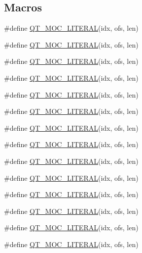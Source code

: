\subsection*{Macros}
\begin{DoxyCompactItemize}
\item 
\#define \hyperlink{a00067_a75bb9482d242cde0a06c9dbdc6b83abe}{Q\+T\+\_\+\+M\+O\+C\+\_\+\+L\+I\+T\+E\+R\+A\+L}(idx, ofs, len)
\item 
\#define \hyperlink{a00067_a75bb9482d242cde0a06c9dbdc6b83abe}{Q\+T\+\_\+\+M\+O\+C\+\_\+\+L\+I\+T\+E\+R\+A\+L}(idx, ofs, len)
\item 
\#define \hyperlink{a00067_a75bb9482d242cde0a06c9dbdc6b83abe}{Q\+T\+\_\+\+M\+O\+C\+\_\+\+L\+I\+T\+E\+R\+A\+L}(idx, ofs, len)
\item 
\#define \hyperlink{a00067_a75bb9482d242cde0a06c9dbdc6b83abe}{Q\+T\+\_\+\+M\+O\+C\+\_\+\+L\+I\+T\+E\+R\+A\+L}(idx, ofs, len)
\item 
\#define \hyperlink{a00067_a75bb9482d242cde0a06c9dbdc6b83abe}{Q\+T\+\_\+\+M\+O\+C\+\_\+\+L\+I\+T\+E\+R\+A\+L}(idx, ofs, len)
\item 
\#define \hyperlink{a00067_a75bb9482d242cde0a06c9dbdc6b83abe}{Q\+T\+\_\+\+M\+O\+C\+\_\+\+L\+I\+T\+E\+R\+A\+L}(idx, ofs, len)
\item 
\#define \hyperlink{a00067_a75bb9482d242cde0a06c9dbdc6b83abe}{Q\+T\+\_\+\+M\+O\+C\+\_\+\+L\+I\+T\+E\+R\+A\+L}(idx, ofs, len)
\item 
\#define \hyperlink{a00067_a75bb9482d242cde0a06c9dbdc6b83abe}{Q\+T\+\_\+\+M\+O\+C\+\_\+\+L\+I\+T\+E\+R\+A\+L}(idx, ofs, len)
\item 
\#define \hyperlink{a00067_a75bb9482d242cde0a06c9dbdc6b83abe}{Q\+T\+\_\+\+M\+O\+C\+\_\+\+L\+I\+T\+E\+R\+A\+L}(idx, ofs, len)
\item 
\#define \hyperlink{a00067_a75bb9482d242cde0a06c9dbdc6b83abe}{Q\+T\+\_\+\+M\+O\+C\+\_\+\+L\+I\+T\+E\+R\+A\+L}(idx, ofs, len)
\item 
\#define \hyperlink{a00067_a75bb9482d242cde0a06c9dbdc6b83abe}{Q\+T\+\_\+\+M\+O\+C\+\_\+\+L\+I\+T\+E\+R\+A\+L}(idx, ofs, len)
\item 
\#define \hyperlink{a00067_a75bb9482d242cde0a06c9dbdc6b83abe}{Q\+T\+\_\+\+M\+O\+C\+\_\+\+L\+I\+T\+E\+R\+A\+L}(idx, ofs, len)
\item 
\#define \hyperlink{a00067_a75bb9482d242cde0a06c9dbdc6b83abe}{Q\+T\+\_\+\+M\+O\+C\+\_\+\+L\+I\+T\+E\+R\+A\+L}(idx, ofs, len)
\item 
\#define \hyperlink{a00067_a75bb9482d242cde0a06c9dbdc6b83abe}{Q\+T\+\_\+\+M\+O\+C\+\_\+\+L\+I\+T\+E\+R\+A\+L}(idx, ofs, len)

\end{DoxyCompactItemize}
